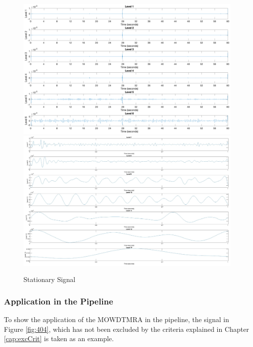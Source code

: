\begin{figure}[p]
    \centering
   \includegraphics[width=\textwidth]{img/level1_new.pdf}
    \includegraphics[width=\textwidth]{img/lev2.png}
    \caption{Stationary Signal}
    \label{fig:level1}
\end{figure}

\subsubsection{Application in the Pipeline}
To show the application of the MOWDTMRA in the pipeline, the signal in Figure \ref{fig:404}, which has not been excluded by the criteria explained in Chapter \ref{cap:excCrit} is taken as an example.

